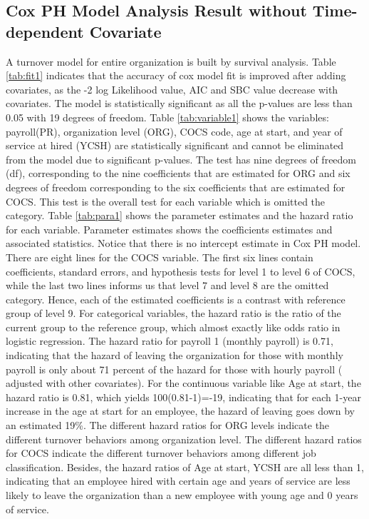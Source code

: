 \subsection{Cox PH Model Analysis Result without Time-dependent Covariate}
A turnover model for entire organization is built by survival analysis.  Table \ref{tab:fit1} indicates that the accuracy of cox model fit is improved after adding covariates, as the -2 log Likelihood value, AIC and SBC value decrease with covariates. The model is statistically significant as all the p-values are less than 0.05 with 19 degrees of freedom. Table \ref{tab:variable1} shows the variables: payroll(PR), organization level (ORG), COCS code, age at start, and year of service at hired (YCSH) are statistically significant and cannot be eliminated from the model due to significant p-values. The test has nine degrees of freedom (df), corresponding to the nine coefficients that are estimated for ORG and six degrees of freedom corresponding to the six coefficients that are estimated for COCS. This test is the overall test for each variable which is omitted the category. Table \ref{tab:para1} shows the parameter estimates and the hazard ratio for each variable. Parameter estimates shows the coefficients estimates and associated statistics. Notice that there is no intercept estimate in Cox PH model. There are eight lines for the COCS variable. The first six lines contain coefficients, standard errors, and hypothesis tests for level 1 to level 6 of COCS, while the last two lines informs us that level 7 and level 8 are the omitted category. Hence, each of the estimated coefficients is a contrast with reference group of level 9. For categorical variables, the hazard ratio is the ratio of the current group to the reference group, which almost exactly like odds ratio in logistic regression. The hazard ratio for payroll 1 (monthly payroll) is 0.71, indicating that the hazard of leaving the organization for those with monthly payroll is only about 71 percent of the hazard for those with hourly payroll ( adjusted with other covariates). For the continuous variable like Age at start, the hazard ratio is 0.81, which yields 100(0.81-1)=-19, indicating that for each 1-year increase in the age at start for an employee, the hazard of leaving goes down by an estimated 19\%. The different hazard ratios for ORG levels indicate the different turnover behaviors among organization level. The different hazard ratios for COCS indicate the different turnover behaviors among different job classification. Besides, the hazard ratios of Age at start, YCSH are all less than 1, indicating that an employee hired with certain age and years of service are less likely to leave the organization than a new employee with young age and 0 years of service.
